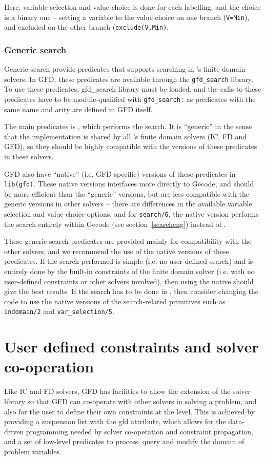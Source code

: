 Here, variable selection and value choice is done for each labelling,
and the choice is a binary one -- setting a variable to the value choice
on one branch (\texttt{V=Min}), and excluded on the other branch 
(\texttt{exclude(V,Min)}.

\subsubsection{Generic search}
Generic search provide predicates that supports searching in \eclipse's 
finite domain solvers. In GFD, these predicates are available through the
{\tt gfd_search} library. To use these predicates, gfd_search library must
be loaded, and the calls to these predicates have to be module-qualified
with {\tt gfd_search:} as predicates with the same name and arity are defined
in GFD itself.

The main predicates is
, which performs the search. It is 
``generic'' in the sense that the implementation is shared
by all \eclipse's finite domain solvers (IC, FD and GFD), so they should be
highly compatible with the versions of these predicates in these solvers.

GFD also have ``native'' (i.e. GFD-specific) versions of these predicates
in {\tt lib(gfd)}. These native versions interfaces more directly to Gecode,
and should be more efficient than the ``generic'' versions, but are less 
compatible with the generic versions in other solvers -- there are differences
in the available variable selection and value choice options, and for 
{\tt search/6}, the native version performs the search entirely within
Gecode (see section~\ref{searcheng}) instead of \eclipse.

These generic search predicates are provided mainly for compatibility with
the other solvers, and we recommend the use of the native versions of these
predicates. If the search performed is simple (i.e. no user-defined search)
and is entirely done by the 
built-in constraints of the finite domain solver (i.e. with no user-defined 
constraints or other solvers involved), then using the native 
 should give the best results. If the search
has to be done in \eclipse, then consider changing the code to use the native 
versions of the search-related primitives such as {\tt indomain/2} and {\tt var_selection/5}.


\section{User defined constraints and solver co-operation}
Like IC and FD solvers, GFD has facilities to allow the extension of the 
solver library so that GFD can co-operate with other solvers in solving a
problem, and also for the user to define their own constraints at the \eclipse
level. This is achieved by providing a suspension list with the gfd attribute,
which allows for the data-driven programming needed by solver co-operation and
constraint propagation, and a set of low-level predicates to process,
 query and  modify the domain of problem variables.


